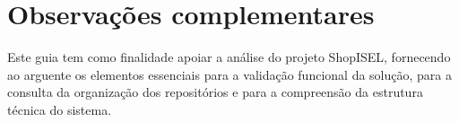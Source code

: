 \documentclass[a4paper,11pt]{article}
\let\oldsection\section
\renewcommand{\section}{\Needspace{8\baselineskip}\oldsection}
\begin{document}
\section{Observa\c{c}\~oes complementares}

Este guia tem como finalidade apoiar a an\'alise do projeto ShopISEL, fornecendo ao arguente os elementos essenciais para a valida\c{c}\~ao funcional da solu\c{c}\~ao, para a consulta da organiza\c{c}\~ao dos reposit\'orios e para a compreens\~ao da estrutura t\'ecnica do sistema.
\end{document}
